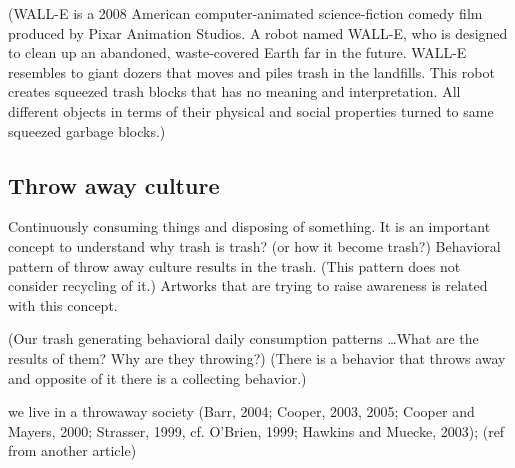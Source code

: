  \cite{zubiaurre2015trash}

(WALL-E is a 2008 American computer-animated science-fiction comedy film produced by Pixar Animation Studios. A robot named WALL-E, who is designed to clean up an abandoned, waste-covered Earth far in the future. WALL-E resembles to giant dozers that moves and piles trash in the landfills. This robot creates squeezed trash blocks that has no meaning and interpretation. All different objects in terms of their physical and social properties turned to same squeezed garbage blocks.)

\subsection{Throw away culture}
Continuously consuming things and disposing of something. It is an important concept to understand why trash is trash? (or how it become trash?) Behavioral pattern of throw away culture results in the trash. (This pattern does not consider recycling of it.) Artworks that are trying to raise awareness is related with this concept.

(Our trash generating behavioral daily consumption patterns \ldots What are the results of them? Why are they throwing?) (There is a behavior that throws away and opposite of it there is a collecting behavior.) 

we live in a throwaway society (Barr, 2004; Cooper, 2003, 2005; Cooper and Mayers, 2000; Strasser, 1999, cf. O’Brien, 1999; Hawkins and Muecke, 2003); (ref from another article)

